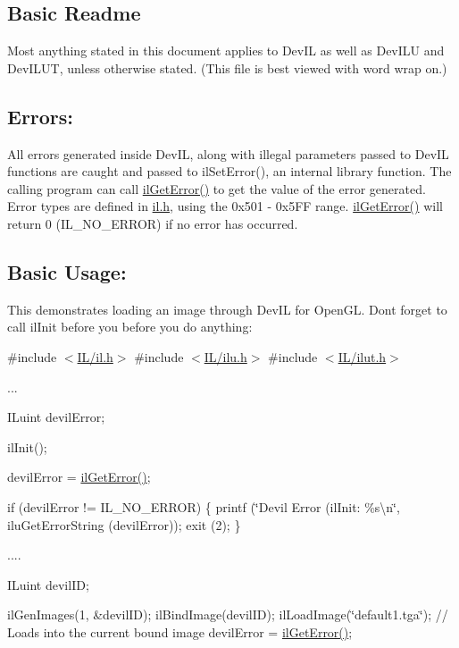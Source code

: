 \subsection*{Basic Readme }

Most anything stated in this document applies to Dev\+IL as well as Dev\+I\+LU and Dev\+I\+L\+UT, unless otherwise stated. (This file is best viewed with word wrap on.)

\subsection*{Errors\+: }

All errors generated inside Dev\+IL, along with illegal parameters passed to Dev\+IL functions are caught and passed to il\+Set\+Error(), an internal library function. The calling program can call \hyperlink{il_8h_add4600e363a1e68cf5f5e34e5bce5bac}{il\+Get\+Error()} to get the value of the error generated. Error types are defined in \hyperlink{il_8h}{il.\+h}, using the 0x501 -\/ 0x5\+FF range. \hyperlink{il_8h_add4600e363a1e68cf5f5e34e5bce5bac}{il\+Get\+Error()} will return 0 (I\+L\+\_\+\+N\+O\+\_\+\+E\+R\+R\+OR) if no error has occurred.

\subsection*{Basic Usage\+: }

This demonstrates loading an image through Dev\+IL for Open\+GL. Don\textquotesingle{}t forget to call il\+Init before you before you do anything\+:

\#include $<$\hyperlink{il_8h}{I\+L/il.\+h}$>$ \#include $<$\hyperlink{ilu_8h}{I\+L/ilu.\+h}$>$ \#include $<$\hyperlink{ilut_8h}{I\+L/ilut.\+h}$>$

...

I\+Luint devil\+Error;

il\+Init();

devil\+Error = \hyperlink{il_8h_add4600e363a1e68cf5f5e34e5bce5bac}{il\+Get\+Error()};

if (devil\+Error != I\+L\+\_\+\+N\+O\+\_\+\+E\+R\+R\+OR) \{ printf (\char`\"{}\+Devil Error (il\+Init\+: \%s\textbackslash{}n\char`\"{}, ilu\+Get\+Error\+String (devil\+Error)); exit (2); \}

....

I\+Luint devil\+ID;

il\+Gen\+Images(1, \&devil\+I\+D); il\+Bind\+Image(devil\+I\+D); il\+Load\+Image(\char`\"{}default1.\+tga\char`\"{}); // Loads into the current bound image devil\+Error = \hyperlink{il_8h_add4600e363a1e68cf5f5e34e5bce5bac}{il\+Get\+Error()};


